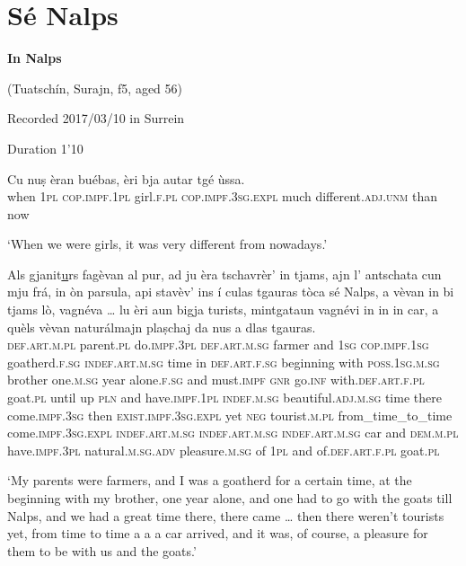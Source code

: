 \section{Sé Nalps}

\noindent
\textbf{In Nalps}

\noindent
(Tuatschín, Surajn, f5, aged 56)

\noindent
Recorded 2017/03/10 in Surrein

\noindent
Duration 1'10
\bigskip

\begin{linenumbers}
\gll    Cu nuṣ èran buébas, èri bja autar tgé ùssa. \\
 when \textsc{1pl} \textsc{cop.impf.1pl} girl.\textsc{f.pl} \textsc{cop.impf.3sg.expl} much different.\textsc{adj.unm} than now \\
\end{linenumbers}
\medskip
\glt `When we were girls, it was very different from nowadays.'
\medskip

\begin{linenumbers}
\gll    Als gjanit\underline{u}rs fagèvan al pur, ad ju èra tschavrèr’ in tjams, ajn l’ antschata cun mju frá, in òn parsula, api stavèv’ ins í culas tgauras tòca sé Nalps, a vèvan in bi tjams lò, vagnéva … lu èri aun bigja turists, mintgataun vagnévi in in in car, a quèls vèvan naturálmajn plaṣchaj da nus a dlas tgauras. \\
\textsc{def.art.m.pl} parent.\textsc{pl} do.\textsc{impf.3pl} \textsc{def.art.m.sg} farmer and \textsc{1sg} \textsc{cop.impf.1sg} goatherd.\textsc{f.sg} \textsc{indef.art.m.sg} time in \textsc{def.art.f.sg} beginning with \textsc{poss.1sg.m.sg} brother one.\textsc{m.sg} year alone.\textsc{f.sg} and must.\textsc{impf} \textsc{gnr} go.\textsc{inf} with.\textsc{def.art.f.pl} goat.\textsc{pl} until up \textsc{pln} and have.\textsc{impf.1pl} \textsc{indef.m.sg} beautiful.\textsc{adj.m.sg} time there come.\textsc{impf.3sg} {} then \textsc{exist.impf.3sg.expl} yet \textsc{neg} tourist.\textsc{m.pl} from\_time\_to\_time come.\textsc{impf.3sg.expl} \textsc{indef.art.m.sg} \textsc{indef.art.m.sg} \textsc{indef.art.m.sg} car and \textsc{dem.m.pl} have.\textsc{impf.3pl} natural.\textsc{m.sg.adv}  pleasure.\textsc{m.sg} of \textsc{1pl} and of.\textsc{def.art.f.pl} goat.\textsc{pl} \\
\end{linenumbers}
\medskip
\glt `My parents were farmers, and I was a goatherd for a certain time, at the beginning with my brother, one year alone, and one had to go with the goats till Nalps, and we had a great time there, there came … then there weren’t tourists yet, from time to time a a a car arrived, and it was, of course, a pleasure for them to be with us and the goats.'
\medskip

